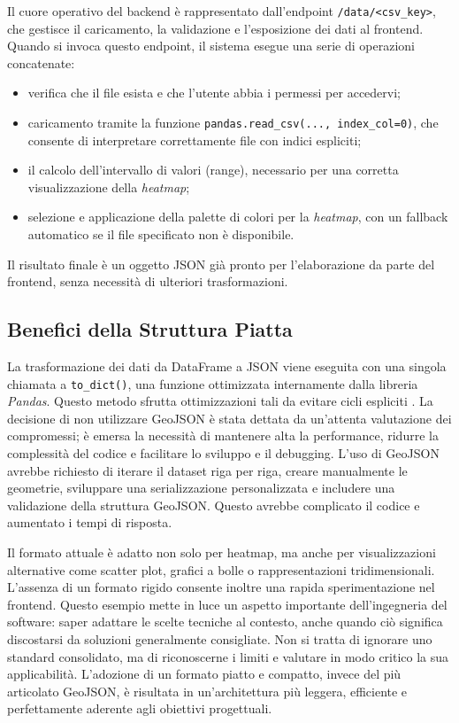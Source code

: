 Il cuore operativo del backend è rappresentato dall'endpoint \texttt{/data/<csv\_key>}, che gestisce il caricamento, la validazione e l'esposizione dei dati al frontend. Quando si invoca questo endpoint, il sistema esegue una serie di operazioni concatenate:

\begin{itemize}
  \item verifica che il file esista e che l'utente abbia i permessi per accedervi;
  \item caricamento tramite la funzione \texttt{pandas.read\_csv(..., index\_col=0)}, che consente di interpretare correttamente file con indici espliciti; \cite{pandas-readcsv}
  \item il calcolo dell'intervallo di valori (range), necessario per una corretta visualizzazione della \textit{heatmap};
  \item selezione e applicazione della palette di colori per la \textit{heatmap}, con un fallback automatico se il file specificato non è disponibile.
\end{itemize}

Il risultato finale è un oggetto JSON già pronto per l'elaborazione da parte del frontend, senza necessità di ulteriori trasformazioni.

\newpage

\subsection{Benefici della Struttura Piatta}
\label{ss:why-not-geojson}

La trasformazione dei dati da DataFrame a JSON viene eseguita con una singola chiamata a \texttt{to\_dict()}, una funzione ottimizzata internamente dalla libreria \textit{Pandas}. Questo metodo sfrutta ottimizzazioni tali da evitare cicli espliciti \cite{pandas-performance}. La decisione di non utilizzare GeoJSON è stata dettata da un'attenta valutazione dei compromessi; è emersa la necessità di mantenere alta la performance, ridurre la complessità del codice e facilitare lo sviluppo e il debugging. L'uso di GeoJSON avrebbe richiesto di iterare il dataset riga per riga, creare manualmente le geometrie, sviluppare una serializzazione personalizzata e includere una validazione della struttura GeoJSON. Questo avrebbe complicato il codice e aumentato i tempi di risposta.

Il formato attuale è adatto non solo per heatmap, ma anche per visualizzazioni alternative come scatter plot, grafici a bolle o rappresentazioni tridimensionali. L'assenza di un formato rigido consente inoltre una rapida sperimentazione nel frontend.
Questo esempio mette in luce un aspetto importante dell'ingegneria del software: saper adattare le scelte tecniche al contesto, anche quando ciò significa discostarsi da soluzioni generalmente consigliate. Non si tratta di ignorare uno standard consolidato, ma di riconoscerne i limiti e valutare in modo critico la sua applicabilità. L'adozione di un formato piatto e compatto, invece del più articolato GeoJSON, è risultata in un'architettura più leggera, efficiente e perfettamente aderente agli obiettivi progettuali.


